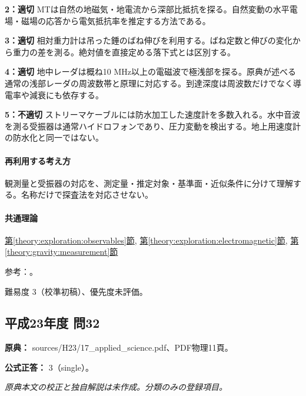 \noindent\textbf{2：適切} MTは自然の地磁気・地電流から深部比抵抗を探る。自然変動の水平電場・磁場の応答から電気抵抗率を推定する方法である。\par

\noindent\textbf{3：適切} 相対重力計は吊った錘のばね伸びを利用する。ばね定数と伸びの変化から重力の差を測る。絶対値を直接定める落下式とは区別する。\par

\noindent\textbf{4：適切} 地中レーダは概ね10 MHz以上の電磁波で極浅部を探る。原典が述べる通常の浅部レーダの周波数帯と原理に対応する。到達深度は周波数だけでなく導電率や減衰にも依存する。\par

\noindent\textbf{5：不適切} ストリーマケーブルには防水加工した速度計を多数入れる。水中音波を測る受振器は通常ハイドロフォンであり、圧力変動を検出する。地上用速度計の防水化と同一ではない。\par

\paragraph{再利用する考え方} 観測量と受振器の対応を、測定量・推定対象・基準面・近似条件に分けて理解する。名称だけで探査法を対応させない。

\paragraph{共通理論} \hyperref[theory:exploration:observables]{第\ref*{theory:exploration:observables}節}, \hyperref[theory:exploration:electromagnetic]{第\ref*{theory:exploration:electromagnetic}節}, \hyperref[theory:gravity:measurement]{第\ref*{theory:gravity:measurement}節}

\par 参考：\cite{usgs_marine_seismic,usgs_mt_metadata}。

\par 難易度 3（校準初稿）、優先度未評価。

\subsection{平成23年度 問32}
\label{q:h23-reg-applied-32}

\noindent\textbf{原典：} sources/H23/17\_applied\_science.pdf、PDF物理11頁。

\textbf{公式正答：} 3（single）。

\par\textit{原典本文の校正と独自解説は未作成。分類のみの登録項目。}

